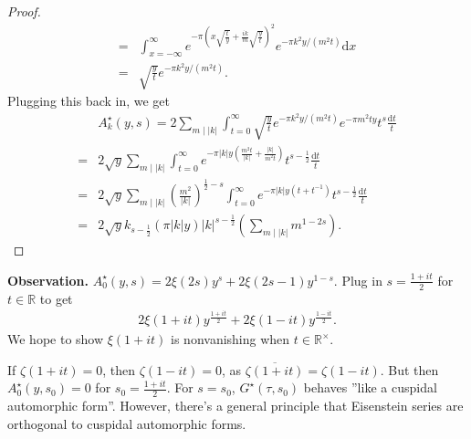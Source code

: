 \documentclass{article}
\theoremstyle{definition}
\begin{document}
\begin{proof}
\begin{align*}
        =& \int_{x=-\infty}^{\infty} e^{-\pi \left(x \sqrt{\frac{t}{y}} + \frac{ik}{m}\sqrt{\frac{y}{t}}\right)^2}e^{-\pi k^2 y/(m^2 t)}\mathrm{d}x \\
        =& \sqrt{\frac{y}{t}} e^{-\pi k^2 y/(m^2 t)}.
    \end{align*}
    Plugging this back in, we get
    \begin{align*}
         &A_k^{\star}(y,s) = 2 \sum_{m \mid |k|}^{} \int_{t=0}^{\infty} \sqrt{\frac{y}{t}}e^{-\pi k^2 y/ (m^2 t)}e^{-\pi m^2 t y }t^{s}\frac{\mathrm{d}t}{t}\\
        =& 2 \sqrt{y}\sum_{m \mid |k|}^{} \int_{t=0}^{\infty} e^{-\pi |k| y \left(\frac{m^2 t}{|k|} + \frac{|k|}{m^2 t}\right)}t^{s-\frac{1}{2}}\frac{\mathrm{d}t}{t} \\
        =& 2\sqrt{y} \sum_{m \mid |k|}^{} \left(\frac{m^2}{|k|}\right)^{\frac{1}{2}-s} \int_{t=0}^{\infty} e^{-\pi |k|y(t+t^{-1})}t^{s-\frac{1}{2}} \frac{\mathrm{d}t}{t} \\
        =& 2 \sqrt{y}k_{s-\frac{1}{2}}(\pi |k|y)|k|^{s-\frac{1}{2}} \left(\sum_{m \mid  |k|}^{} m^{1-2s}\right).
    \end{align*}
\end{proof}
\textbf{Observation.} $A_0^{\star}(y,s) = 2\xi(2s)y^s + 2\xi(2s-1)y^{1-s}$. Plug in $s = \frac{1+it}{2}$ for $t \in \mathbb{R}$ to get 
\begin{align*}
    2\xi(1+it)y^{\frac{1+it}{2}}+2\xi \left(1-it\right)y^{\frac{1-it}{2}}.
\end{align*}
We hope to show $\xi(1+it)$ is nonvanishing when $t \in \mathbb{R}^\times$. 
\vspace{1mm}
 
If $\zeta(1+it)=0$, then $\zeta(1-it)=0$, as $\overline{\zeta(1+it)}=\zeta(1-it)$. But then $A_0^{\star}(y,s_0) = 0$ for $s_0 = \frac{1+it}{2}$. For $s = s_0$, $G^{\star}(\tau, s_0)$ behaves ''like a cuspidal automorphic form''. However, there's a general principle that Eisenstein series are orthogonal to cuspidal automorphic forms.

\end{document}
